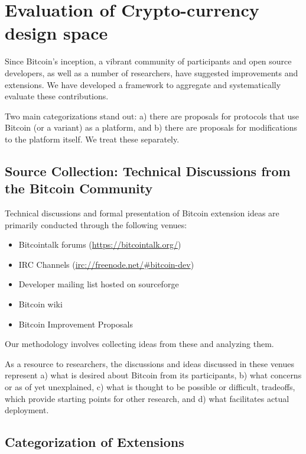 \section{ Evaluation of Crypto-currency design space }

Since Bitcoin's inception, a vibrant community of participants and open source developers, as well as a number of researchers, have suggested improvements and extensions. We have developed a framework to aggregate and systematically evaluate these contributions. 

Two main categorizations stand out: a) there are proposals for protocols that use Bitcoin (or a variant) as a platform, and b) there are proposals for modifications to the platform itself. We treat these separately.



\subsection{ Source Collection: Technical Discussions from the Bitcoin Community}
Technical discussions and formal presentation of Bitcoin extension ideas are primarily conducted through the following venues:
\begin{itemize}
\item Bitcointalk forums (\url{https://bitcointalk.org/})
\item IRC Channels (\url{irc://freenode.net/#bitcoin-dev})
\item Developer mailing list hosted on sourceforge
\item Bitcoin wiki
\item Bitcoin Improvement Proposals
\end{itemize}
Our methodology involves collecting ideas from these and analyzing them.

As a resource to researchers, the discussions and ideas discussed in these venues represent a) what is desired about Bitcoin from its participants, b) what concerns or as of yet unexplained, c) what is thought to be possible or difficult, tradeoffs, which provide starting points for other research, and d) what facilitates actual deployment.

\subsection{Categorization of Extensions}


